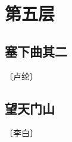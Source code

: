\documentclass[12pt,UTF-8,openany]{ctexbook}
\begin{document}
\vspace{8pt}


\chapter{第五层}

\section{塞下曲其二}

\begin{center}
    \vspace{10pt}
    
    \begin{normalsize}
        
        〔卢纶〕
        
    \end{normalsize}
    
    \vspace{8pt}
    
    \begin{large}
        
        
        
    \end{large}
    
\end{center}

\vspace{8pt}


\section{望天门山}

\begin{center}
    \vspace{10pt}
    
    \begin{normalsize}
        
        〔李白〕
        
    \end{normalsize}
    
    \vspace{8pt}
    
    \begin{large}
        
        
        
    \end{large}
    
\end{center}
\end{document}
